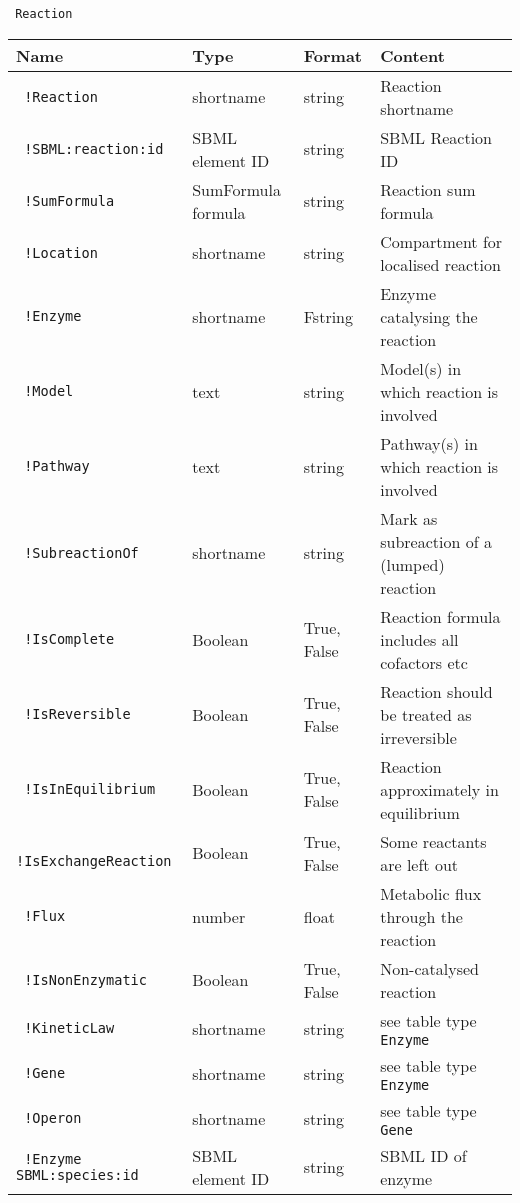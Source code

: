 \documentclass[a4paper]{article}
\newcommand{\tab}[1]{{\texttt{\color{red} #1}}}
\newcommand{\col}[1]{\texttt{\color{blue} #1}}
\begin{document}
\begin{appendix}
\begin{table}[h!]
\label{tab:columnsentities}
\end{table}

\begin{table}
  \tab{Reaction} \\
\begin{tabular}{|l|l|l|l|}
  \hline
  Name & Type & Format & Content \\
  \hline
  \col{!Reaction}       	& shortname 		& string & Reaction shortname \\
  \col{!SBML:reaction:id}   & SBML element ID 	& string & SBML Reaction ID \\
  \col{!SumFormula} 		& SumFormula formula & string & Reaction sum formula \\
  \hline
  \col{!Location}   		& shortname & string & Compartment for localised reaction\\
  \col{!Enzyme}  			& shortname & Fstring & Enzyme catalysing the reaction \\
  \col{!Model}   			& text 		& string & Model(s) in which reaction is involved \\
  \col{!Pathway}  			& text 		& string & Pathway(s) in which reaction is involved \\
  \col{!SubreactionOf} 		& shortname & string & Mark as subreaction of a (lumped) reaction\\
  \hline
  \col{!IsComplete}    		& Boolean & True, False & Reaction formula includes all cofactors etc\\
  \col{!IsReversible}  		& Boolean & True, False & Reaction should be treated as irreversible\\
  \col{!IsInEquilibrium}    & Boolean & True, False & Reaction approximately in equilibrium\\
  \col{!IsExchangeReaction} & Boolean & True, False & Some reactants are left out \\ 
  \hline
  \col{!Flux} 				& number    & float & Metabolic flux through the reaction  \\
  \col{!IsNonEnzymatic} 	& Boolean   & True, False & Non-catalysed reaction \\
  \col{!KineticLaw}   		& shortname & string 	& see table type \tab{Enzyme} \\
  \col{!Gene} 				& shortname & string 	& see table type \tab{Enzyme} \\
  \col{!Operon}  			& shortname & string 	& see table type \tab{Gene}\\
  \hline
  \col{!Enzyme SBML:species:id}    		& SBML element  ID &string & SBML ID of enzyme   \\

\end{tabular}
\end{table}
\end{appendix}
\end{document}
